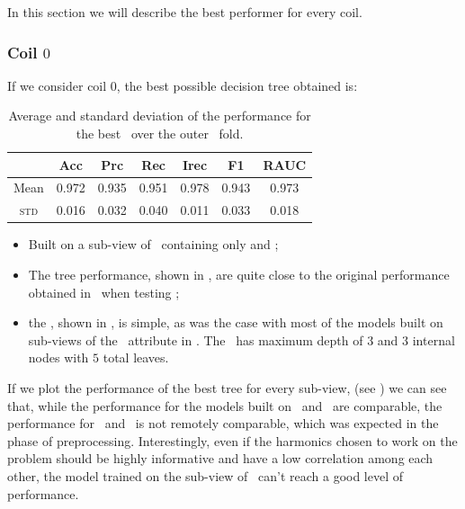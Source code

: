 In this section we will describe the best performer for every coil.

\subsubsection{Coil $0$}
If we consider coil $0$, the best possible decision tree obtained is:

\begin{table}[!ht]
	\caption{Average and standard deviation of the performance for the best \dt\ over the outer \cv\
		fold.}\label{tbl:qlp-coil0-bdt}

	\bigskip
	\setlength{\tabcolsep}{6pt}
	\centering
	\begin{tabular}{ccccccc}
		\toprule
		\textbf{}    & \textbf{Acc} & \textbf{Prc} & \textbf{Rec} & \textbf{Irec} & \textbf{F1} & \textbf{RAUC} \\
		\midrule
		Mean         & 0.972        & 0.935        & 0.951        & 0.978         & 0.943
		             & 0.973                                                                                    \\
		\textsc{std} & 0.016        & 0.032        & 0.040        & 0.011         & 0.033
		             & 0.018                                                                                    \\
		\bottomrule
	\end{tabular}
\end{table}

\begin{itemize}
	\item Built on a sub-view of \an\ containing only \an[2] and \an[3];
	\item The tree performance, shown in \Cref{tbl:qlp-coil0-bdt}, are quite close to the
	      original performance obtained in \qrp\ when testing \dts;
	\item the \dt, shown in , is simple, as was the case with most
	      of the models built on sub-views of the \an\ attribute in \qrp. The \dt\ has maximum
	      depth of $3$ and $3$ internal nodes with $5$ total leaves.
\end{itemize}

If we plot the performance of the best tree for every sub-view, (see ) we can see that, while the performance
for the models built on \an\ and \phin\ are comparable, the performance for \bn\ and \cnmod\ is not
remotely comparable, which was expected in the phase of preprocessing. Interestingly, even if the
harmonics chosen to work on the problem should be highly informative and have a low correlation
among each other, the model trained on the sub-view of \cnmod\ can't reach a good level of
performance.

